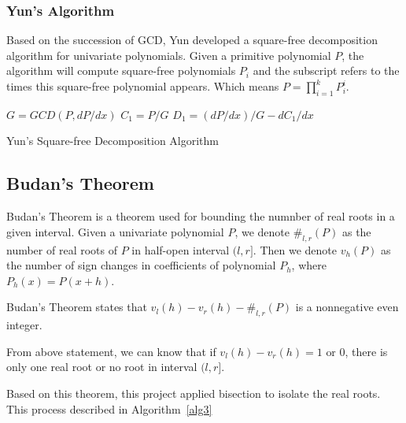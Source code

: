\subsubsection{Yun's Algorithm}

Based on the succession of GCD, Yun developed a square-free decomposition
algorithm for univariate polynomials. Given a primitive polynomial $P$, the
algorithm will compute square-free polynomials $P_i$ and the subscript refers to
the times this square-free polynomial appears. Which means $P= \prod_{i=1}^k
P_i^i$.

\begin{algorithm}[H]
\label{alg2}
\SetAlgoLined


  $G = GCD(P, dP/dx)$\;
  $C_1=P/G$\;
  $D_1 = (dP/dx)/G - dC_1/dx$\;



\caption{Yun's Square-free Decomposition Algorithm}
\end{algorithm}

\subsection{Budan's Theorem}

Budan's Theorem is a theorem used for bounding the numnber of real roots in a
given interval. Given a univariate polynomial $P$, we denote
$\#_{l,r}(P)$ as the number of real roots of $P$ in half-open interval $(l,r]$.
Then we denote $v_h(P)$ as the number of sign changes in coefficients of
polynomial $P_h$, where $P_h(x) = P(x+h)$.

Budan's Theorem states that $v_l(h) - v_r(h) - \#_{l,r}(P)$ is a
nonnegative even integer.

From above statement, we can know that if $v_l(h) - v_r(h) = 1 \text{ or } 0$, there is only
one real root or no root in interval $(l,r]$. 

Based on this theorem, this project applied bisection to isolate the real roots.
This process described in Algorithm~\ref{alg3}

